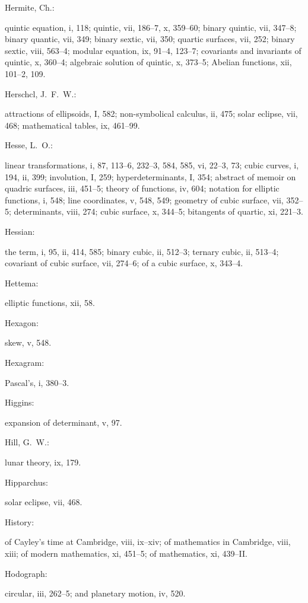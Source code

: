 \documentclass[11pt,a4paper]{book}
\providecommand{\V}[1]{#1}
\providecommand{\IndexEntry}[2]{#1\dotfill #2\par}
\begin{document}
\IndexEntry{Hermite, Ch.}: quintic equation, \V{i}, 118; quintic, \V{vii}, 186--7, \V{x}, 359--60; binary quintic, \V{vii}, 347--8; binary quantic, \V{vii}, 349; binary sextic, \V{vii}, 350; quartic surfaces, \V{vii}, 252; binary sextic, \V{viii}, 563--4; modular equation, \V{ix}, 91--4, 123--7; covariants and invariants of quintic, \V{x}, 360--4; algebraic solution of quintic, \V{x}, 373--5; Abelian functions, \V{xii}, 101--2, 109.

\IndexEntry{Herschcl, J.\ F.\ W.}: attractions of ellipsoids, \V{I}, 582; non-symbolical calculus, \V{ii}, 475; solar eclipse, \V{vii}, 468; mathematical tables, \V{ix}, 461--99.

\newpage

\setcounter{page}{103}

\IndexEntry{Hesse, L.\ O.}: linear transformations, \V{i}, 87, 113--6, 232--3, 584, 585, \V{vi}, 22--3, 73; cubic curves, \V{i}, 194, \V{ii}, 399; involution, \V{I}, 259; hyperdeterminants, \V{I}, 354; abstract of memoir on quadric surfaces, \V{iii}, 451--5; theory of functions, \V{iv}, 604; notation for elliptic functions, \V{i}, 548; line coordinates, \V{v}, 548, 549; geometry of cubic surface, \V{vii}, 352--5; determinants, \V{viii}, 274; cubic surface, \V{x}, 344--5; bitangents of quartic, \V{xi}, 221--3.

\IndexEntry{Hessian}: the term, \V{i}, 95, \V{ii}, 414, 585; binary cubic, \V{ii}, 512--3; ternary cubic, \V{ii}, 513--4; covariant of cubic surface, \V{vii}, 274--6; of a cubic surface, \V{x}, 343--4.

\IndexEntry{Hettema}: elliptic functions, \V{xii}, 58.

\IndexEntry{Hexagon}: skew, \V{v}, 548.

\IndexEntry{Hexagram}: Pascal's, \V{i}, 380--3.

\IndexEntry{Higgins}: expansion of determinant, \V{v}, 97.

\IndexEntry{Hill, G.\ W.}: lunar theory, \V{ix}, 179.

\IndexEntry{Hipparchus}: solar eclipse, \V{vii}, 468.

\IndexEntry{History}: of Cayley's time at Cambridge, \V{viii}, ix--xiv; of mathematics in Cambridge, \V{viii}, xiii; of modern mathematics, \V{xi}, 451--5; of mathematics, \V{xi}, 439--II.

\IndexEntry{Hodograph}: circular, \V{iii}, 262--5; and planetary motion, \V{iv}, 520.
\end{document}
